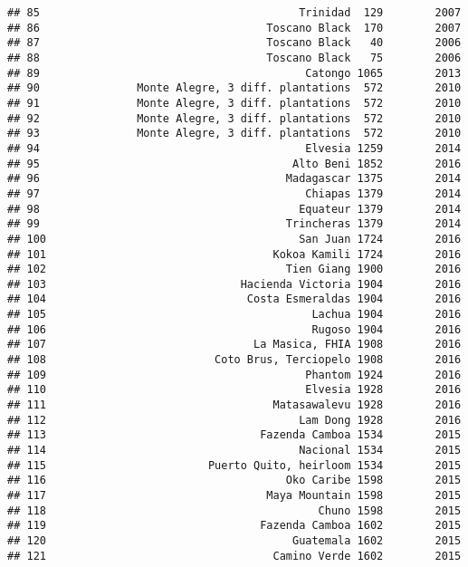 \documentclass[
]{article}
\begin{document}
\begin{verbatim}
## 85                                        Trinidad  129        2007
## 86                                   Toscano Black  170        2007
## 87                                   Toscano Black   40        2006
## 88                                   Toscano Black   75        2006
## 89                                         Catongo 1065        2013
## 90               Monte Alegre, 3 diff. plantations  572        2010
## 91               Monte Alegre, 3 diff. plantations  572        2010
## 92               Monte Alegre, 3 diff. plantations  572        2010
## 93               Monte Alegre, 3 diff. plantations  572        2010
## 94                                         Elvesia 1259        2014
## 95                                       Alto Beni 1852        2016
## 96                                      Madagascar 1375        2014
## 97                                         Chiapas 1379        2014
## 98                                        Equateur 1379        2014
## 99                                      Trincheras 1379        2014
## 100                                       San Juan 1724        2016
## 101                                   Kokoa Kamili 1724        2016
## 102                                     Tien Giang 1900        2016
## 103                              Hacienda Victoria 1904        2016
## 104                               Costa Esmeraldas 1904        2016
## 105                                         Lachua 1904        2016
## 106                                         Rugoso 1904        2016
## 107                                La Masica, FHIA 1908        2016
## 108                          Coto Brus, Terciopelo 1908        2016
## 109                                        Phantom 1924        2016
## 110                                        Elvesia 1928        2016
## 111                                   Matasawalevu 1928        2016
## 112                                       Lam Dong 1928        2016
## 113                                 Fazenda Camboa 1534        2015
## 114                                       Nacional 1534        2015
## 115                         Puerto Quito, heirloom 1534        2015
## 116                                     Oko Caribe 1598        2015
## 117                                  Maya Mountain 1598        2015
## 118                                          Chuno 1598        2015
## 119                                 Fazenda Camboa 1602        2015
## 120                                      Guatemala 1602        2015
## 121                                   Camino Verde 1602        2015

\end{verbatim}
\end{document}
